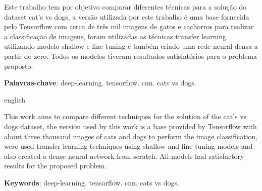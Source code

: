 
\begin{resumoumacoluna}
 Este trabalho tem por objetivo comparar diferentes técnicas para a solução do dataset cat's vs dogs, a versão utilizada por este trabalho é uma base fornecida pelo Tensorflow com cerca de três mil imagens de gatos e cachorros para realizar a classificação de imagens, foram utilizadas as técnicas transfer learning utilizando modelo shallow e fine tuning e também criado uma rede neural densa a partir do zero. Todos os modelos tiveram resultados satisfatórios para o problema proposto.
 
 \vspace{\onelineskip}
 
 \noindent
 \textbf{Palavras-chave}: deep-learning. tensorflow. cnn. cats vs dogs.
\end{resumoumacoluna}


\renewcommand{\resumoname}{Abstract}
\begin{resumoumacoluna}
 \begin{otherlanguage*}{english}

This work aims to compare different techniques for the solution of the cat's vs dogs dataset, the version used by this work is a base provided by Tensorflow with about three thousand images of cats and dogs to perform the image classification, were used transfer learning techniques using shallow and fine tuning models and also created a dense neural network from scratch. All models had satisfactory results for the proposed problem.

   \vspace{\onelineskip}
 
   \noindent
   \textbf{Keywords}: deep-learning. tensorflow. cnn. cats vs dogs.
 \end{otherlanguage*}  
\end{resumoumacoluna}